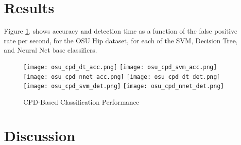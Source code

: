 \section{Results}
Figure \ref{fig:cpd_perf}, shows accuracy and detection time as a function of the
false positive rate per second, for the OSU Hip dataset,
for each of the SVM, Decision Tree, and Neural Net base classifiers.

\begin{figure}
 \centering
 \texttt{[image: osu\_cpd\_dt\_acc.png]}
 \texttt{[image: osu\_cpd\_svm\_acc.png]}
 \texttt{[image: osu\_cpd\_nnet\_acc.png]}
 \texttt{[image: osu\_cpd\_dt\_det.png]}
 \texttt{[image: osu\_cpd\_svm\_det.png]}
 \texttt{[image: osu\_cpd\_nnet\_det.png]}
 \caption{CPD-Based Classification Performance}
 \label{fig:cpd_perf}
\end{figure}

\section{Discussion}
